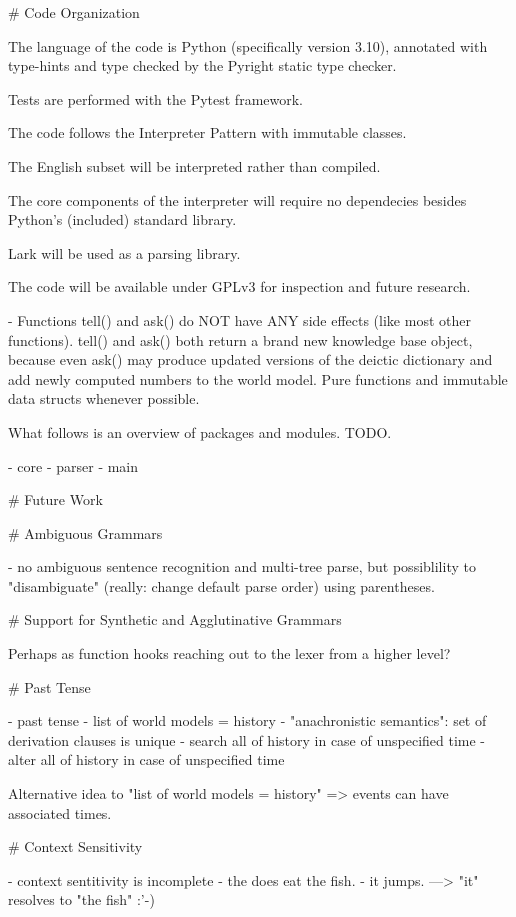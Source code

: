 # Code Organization

The language of the code is Python (specifically version 3.10), annotated with type-hints and type checked by the Pyright static type checker.

Tests are performed with the Pytest framework.

The code follows the Interpreter Pattern with immutable classes.

The English subset will be interpreted rather than compiled.

The core components of the interpreter will require no dependecies besides Python's (included) standard library.

Lark will be used as a parsing library.

The code will be available under GPLv3 for inspection and future research.

- Functions tell() and ask() do NOT have ANY side effects (like most other
  functions). tell() and ask() both return a brand new knowledge base object,
  because even ask() may produce updated versions of the deictic dictionary and
  add newly computed numbers to the world model. Pure functions and immutable
  data structs whenever possible.

What follows is an overview of packages and modules. TODO.

- core
- parser
- main




# Future Work

# Ambiguous Grammars

- no ambiguous sentence recognition and multi-tree parse, but possiblility to
  "disambiguate" (really: change default parse order) using parentheses.


# Support for Synthetic and Agglutinative Grammars

Perhaps as function hooks reaching out to the lexer from a higher level?

# Past Tense

- past tense
  - list of world models = history
  - "anachronistic semantics": set of derivation clauses is unique
  - search all of history in case of unspecified time
  - alter all of history in case of unspecified time

Alternative idea to "list of world models = history" => events can have associated times.

# Context Sensitivity

- context sentitivity is incomplete
  - the does eat the fish.
  - it jumps. ---> "it" resolves to "the fish" :'-)

